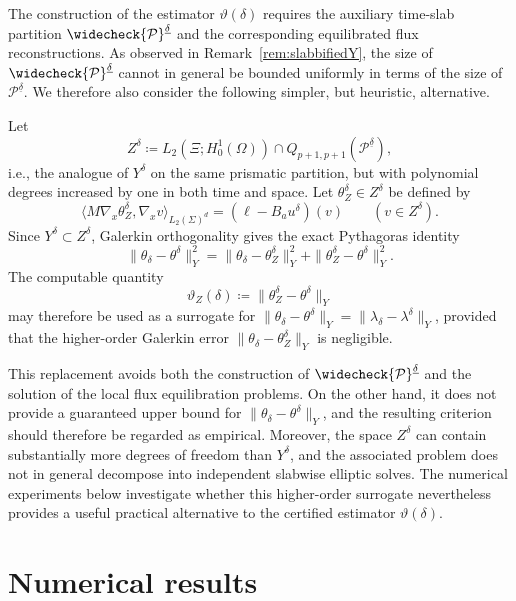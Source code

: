 \documentclass{amsart}
\numberwithin{equation}{section}
\newcommand{\1}{\mathbb 1}
\newcommand{\pria}{{\mathcal P}}
\begin{document}
\begin{remark}\label{rem:pjotr-benadering}
The construction of the estimator $\vartheta(\delta)$ requires the auxiliary time-slab partition $\widecheck{\pria}^{\underline{\delta}}$ and the corresponding equilibrated flux reconstructions. As observed in Remark~\ref{rem:slabbifiedY}, the size of $\widecheck{\pria}^{\underline{\delta}}$ cannot in general be bounded uniformly in terms of the size of $\pria^{\underline{\delta}}$. We therefore also consider the following simpler, but heuristic, alternative.

Let
\[
    Z^\delta \coloneqq L_2(\Xi;H_0^1(\Omega)) \cap Q_{p+1,p+1}(\pria^{\underline{\delta}}),
\]
i.e., the analogue of $Y^\delta$ on the same prismatic partition, but with polynomial degrees increased by one in both time and space. Let $\theta_Z^\delta\in Z^\delta$ be defined by
\[
    \langle M\nabla_x \theta_Z^\delta,\nabla_x v\rangle_{L_2(\Sigma)^d} = (\ell-B_a u^\delta)(v) \qquad (v\in Z^\delta).
\]
Since $Y^\delta\subset Z^\delta$, Galerkin orthogonality gives the exact
Pythagoras identity
\[
    \|\theta_\delta-\theta^\delta\|_Y^2 = \|\theta_\delta-\theta_Z^\delta\|_Y^2 + \|\theta_Z^\delta-\theta^\delta\|_Y^2 .
\]
The computable quantity
\[
    \vartheta_Z(\delta) \coloneqq \|\theta_Z^\delta-\theta^\delta\|_Y
\]
may therefore be used as a surrogate for $\|\theta_\delta-\theta^\delta\|_Y = \|\lambda_\delta-\lambda^\delta\|_Y$, provided that the higher-order Galerkin error $\|\theta_\delta-\theta_Z^\delta\|_Y$ is negligible.

This replacement avoids both the construction of $\widecheck{\pria}^{\underline{\delta}}$ and the solution of the local flux equilibration problems. On the other hand, it does not provide a guaranteed upper bound for $\|\theta_\delta-\theta^\delta\|_Y$, and the resulting criterion should therefore be regarded as empirical. Moreover, the space $Z^\delta$ can contain substantially more degrees of freedom than $Y^\delta$, and the associated problem does not in general decompose into independent slabwise elliptic solves. The numerical experiments below investigate whether this higher-order surrogate nevertheless provides a useful practical alternative to the certified estimator $\vartheta(\delta)$.
\end{remark}

\section{Numerical results}
\label{sec:numerics}
\end{document}
